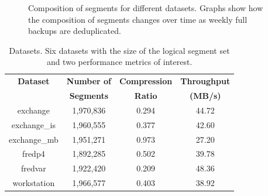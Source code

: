 \begin{figure}[!t]
\ContinuedFloat
\centering
{}
\captionsetup{format=myformat}
\caption{Composition of segments for different datasets. Graphs show how the composition of segments changes over time as weekly full backups are deduplicated.}
\label{fig_sim}
\end{figure}

\begin{table}[!t]
\centering
\begin{tabular}{c||c c c}
\hline
\bfseries Dataset 	&\bfseries Number of	&\bfseries Compression 	&\bfseries Throughput	\\
 			&\bfseries Segments	&\bfseries Ratio 		&\bfseries (MB/s)		\\
\hline\hline
exchange 		&1,970,836			&0.294			&44.72			\\
exchange\_is	&1,960,555			&0.377			&42.60			\\
exchange\_mb 	&1,951,271			&0.973			&27.20			\\
fredp4		&1,892,285			&0.502			&39.78			\\
fredvar		&1,922,420			&0.209			&48.36			\\
workstation		&1,966,577			&0.403			&38.92			\\
\hline  
\end{tabular}
\captionsetup{format=myformat}
\caption{Datasets. Six datasets with the size of the logical segment set and two performance metrics of interest.}
\label{ds_t}
\end{table}

